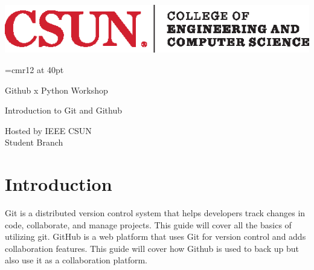 \documentclass[12pt, a4paper]{article}
\begin{document}
\thispagestyle{empty}

\includegraphics[scale=2]{../images/ECS.eps}

\vspace{2in}
\font\tmpfont=cmr12 at 40pt  %
{\centering\tmpfont Github x Python Workshop \par}

\vskip30pt

\doublespacing
{\centering\Huge Introduction to Git and Github \par}

\vspace{3in}

\begin{flushright}	
	{\Large Hosted by IEEE CSUN\\
	Student Branch}
\end{flushright}
\singlespacing
\newpage

\doublespacing %
\tableofcontents
{}
\singlespacing %
\newpage

\setlength{\headheight}{40pt}
\pagestyle{fancy}

\newenvironment{answer}{\par\bf}{}

\section{Introduction}
Git is a distributed version control system that helps developers track changes in code, collaborate, and manage projects. This guide will cover all the basics of utilizing git. GitHub is a web platform that uses Git for version control and adds collaboration features. This guide will cover how Github is used to back up but also use it as a collaboration platform.
\end{document}
